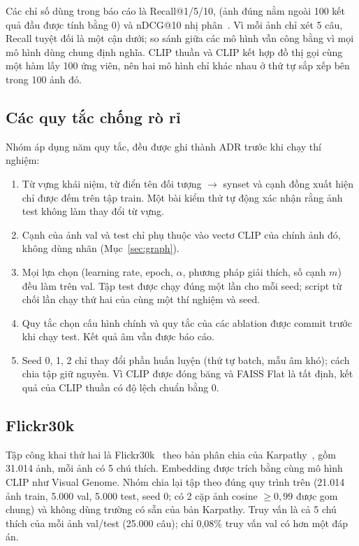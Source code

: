 Các chỉ số dùng trong báo cáo là Recall@1/5/10, \mrr{} (ảnh đúng nằm ngoài 100 kết quả đầu được tính bằng 0) và nDCG@10 nhị phân~\cite{jarvelin2002ndcg}. Vì mỗi ảnh chỉ xét 5 câu, Recall tuyệt đối là một cận dưới; so sánh giữa các mô hình vẫn công bằng vì mọi mô hình dùng chung định nghĩa. CLIP thuần và CLIP kết hợp đồ thị gọi cùng một hàm lấy 100 ứng viên, nên hai mô hình chỉ khác nhau ở thứ tự sắp xếp bên trong 100 ảnh đó.

\subsection{Các quy tắc chống rò rỉ}
Nhóm áp dụng năm quy tắc, đều được ghi thành ADR trước khi chạy thí nghiệm:
\begin{enumerate}
\item Từ vựng khái niệm, từ điển tên đối tượng $\to$ synset và cạnh đồng xuất hiện chỉ được đếm trên tập train. Một bài kiểm thử tự động xác nhận rằng ảnh test không làm thay đổi từ vựng.
\item Cạnh của ảnh val và test chỉ phụ thuộc vào vectơ CLIP của chính ảnh đó, không dùng nhãn (Mục~\ref{sec:graph}).
\item Mọi lựa chọn (learning rate, epoch, $\alpha$, phương pháp giải thích, số cạnh $m$) đều làm trên val. Tập test được chạy đúng một lần cho mỗi seed; script từ chối lần chạy thứ hai của cùng một thí nghiệm và seed.
\item Quy tắc chọn cấu hình chính và quy tắc của các ablation được commit trước khi chạy test. Kết quả âm vẫn được báo cáo.
\item Seed 0, 1, 2 chỉ thay đổi phần huấn luyện (thứ tự batch, mẫu âm khó); cách chia tập giữ nguyên. Vì CLIP được đóng băng và FAISS Flat là tất định, kết quả của CLIP thuần có độ lệch chuẩn bằng 0.
\end{enumerate}

\subsection{Flickr30k}
Tập công khai thứ hai là Flickr30k~\cite{young2014flickr} theo bản phân chia của Karpathy~\cite{karpathy2015}, gồm 31.014 ảnh, mỗi ảnh có 5 chú thích. Embedding được trích bằng cùng mô hình CLIP như Visual Genome. Nhóm chia lại tập theo đúng quy trình trên (21.014 ảnh train, 5.000 val, 5.000 test, seed 0; có 2 cặp ảnh cosine $\ge 0,99$ được gom chung) và không dùng trường  có sẵn của bản Karpathy. Truy vấn là cả 5 chú thích của mỗi ảnh val/test (25.000 câu); chỉ 0,08\% truy vấn val có hơn một đáp án.

